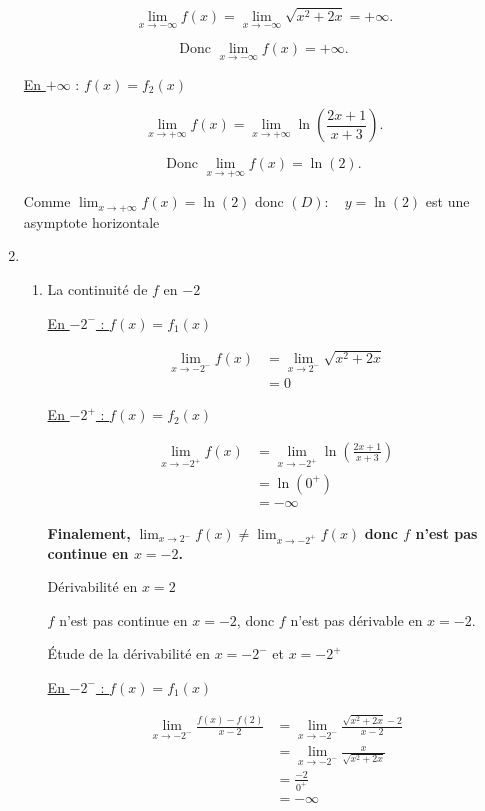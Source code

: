 \documentclass[12pt,a4paper]{article}
\begin{document}
\begin{enumerate}
\[
\lim_{x \to -\infty} f(x) = \lim_{x \to -\infty} \sqrt{x^2 + 2x} = +\infty.
\]

\[
\text{Donc } \lim_{x \to -\infty} f(x) = +\infty.
\]

\underline{En $+\infty$} : $f(x) = f_2(x)$

\[
\lim_{x \to +\infty} f(x) = \lim_{x \to +\infty} \ln\left(\frac{2x + 1}{x + 3}\right).
\]

\[
\text{Donc } \lim_{x \to +\infty} f(x) = \ln(2).
\]

Comme $\lim_{x \to +\infty} f(x) = \ln(2)$ donc $(D): \quad y=\ln(2)$ est une asymptote horizontale
\item 
\begin{enumerate}
    \item La continuité de $f$ en $-2$
    
   \underline{ En $-2^{-}$ : $f(x) = f_1(x)$ }
   
\begin{align*}
    \lim_{x \to -2^-} f(x) &= \lim_{x \to 2^-} \sqrt{x^2 + 2x}\\
                          &= 0
\end{align*}

\underline{ En $-2^{+}$ : $f(x) = f_2(x)$ }

\begin{align*}
    \lim_{x \to -2^+} f(x) &= \lim_{x \to -2^+} \ln\left(\frac{2x + 1}{x + 3}\right)\\
                          &= \ln(0^+)\\
                          &= -\infty
\end{align*}

\textbf{Finalement,} $ \lim_{x \to 2^-} f(x) \neq \lim_{x \to -2^+} f(x) $ \textbf{donc $f$ n'est pas continue en $x = -2$.}

    Dérivabilité en \( x = 2 \)

\( f \) n'est pas continue en \( x = -2 \), donc \( f \) n'est pas dérivable en \( x = -2 \).

    Étude de la dérivabilité en \( x = -2^- \) et \( x = -2^+ \)

\underline{ En $-2^{-}$ : $f(x) = f_1(x)$ }

\begin{align*}
    \lim_{x \to -2^-} \frac{f(x) - f(2)}{x - 2} &= \lim_{x \to -2^-} \frac{\sqrt{x^2 + 2x} - 2}{x - 2}\\ 
    &= \lim_{x \to -2^-} \frac{x}{\sqrt{x^2 + 2x}}\\
    &= \frac{-2}{0^+}\\ 
    &= -\infty                                        
\end{align*}


\end{enumerate}
\end{enumerate}
\end{document}
